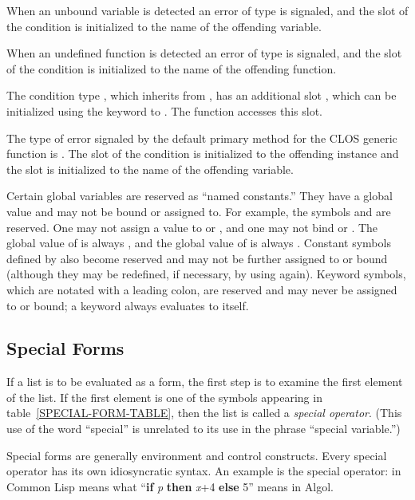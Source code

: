 When an unbound variable 
is detected an error of type  is signaled,
and the  slot of the
 condition is initialized to the name of the
offending variable.

When an undefined function
is detected an error of type  is signaled,
and the  slot of the
 condition is initialized to the name of the
offending function.

The condition type , which inherits from
, has an additional slot , which
can be initialized using the  keyword to .
The function  accesses this slot.

The type of error signaled by the default primary
method for the CLOS  generic function is .
The  slot
of the  condition is initialized to the offending instance
and the  slot is initialized
to the name of the offending variable.

Certain global variables are reserved as ``named constants.''
They have a global value and may not be bound or assigned to.
For example,
the symbols {\true} and {\false} are reserved.
One may not assign a value to {\true} or {\false},
and one may not bind {\true} or {\false}.  The global value of
{\true} is always {\true}, and the global value of
{\false} is always {\false}.  Constant symbols defined by
 also become reserved and may not be further
assigned to or bound (although they may be redefined, if necessary, by
using  again).  Keyword symbols,
which are notated with a leading colon, are reserved and
may never be assigned to or bound; a keyword always evaluates
to itself.

\subsection{Special Forms}

If a list is to be evaluated as a form, the first step is to examine
the first element of the list.  If the first element is one of
the symbols appearing in table~\ref{SPECIAL-FORM-TABLE},
then the list is called a \emph{special operator}.  (This use of the word
``special'' is unrelated to its use in the phrase ``special variable.'')

Special forms are generally environment and control constructs.
Every special operator has its own idiosyncratic syntax.  An example
is the  special operator:
 in Common Lisp means what
``\textbf{if} \emph{p} \textbf{then} \emph{x}+4 \textbf{else} 5'' means in
Algol.


